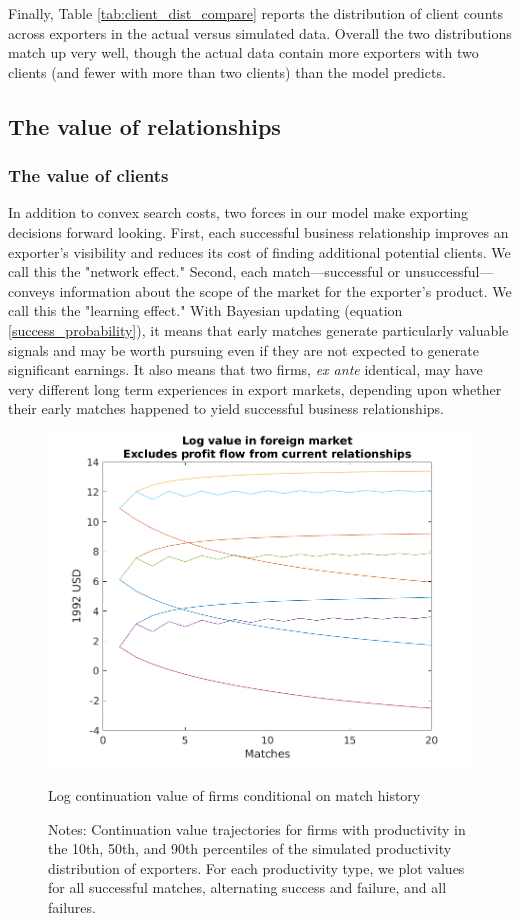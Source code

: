 \documentclass[12pt]{article}
\begin{document}
Finally, Table \ref{tab:client_dist_compare} reports the distribution of
client counts across exporters in the actual versus simulated data. Overall
the two distributions match up very well, though the actual data contain
more exporters with two clients (and fewer with more than two clients) than
the model predicts.

\subsection{The value of relationships}

\subsubsection{The value of clients}

In addition to convex search costs, two forces in our model make exporting
decisions forward looking. First, each successful business relationship
improves an exporter's visibility and reduces its cost of finding additional
potential clients. We call this the "network effect." Second, each
match---successful or unsuccessful---conveys information about the scope of
the market for the exporter's product. We call this the "learning effect."
With Bayesian updating (equation \ref{success_probability}), it means that
early matches generate particularly valuable signals and may be worth
pursuing even if they are not expected to generate significant earnings. It
also means that two firms, \textit{ex ante} identical, may have very
different long term experiences in export markets, depending upon whether
their early matches happened to yield successful business relationships.

\begin{figure}
    \centering
    \includegraphics[scale=0.5]{figures/val_f_three_types}
    \caption{Log continuation value of firms conditional on match history}
    \label{fig:val_three_types}
    \caption*{Notes: Continuation value trajectories for firms with productivity in the 10th, 50th, and 90th percentiles of the simulated productivity distribution of exporters.  For each productivity type, we plot values for all successful matches, alternating success and failure, and all failures.}
\end{figure} 
\end{document}
